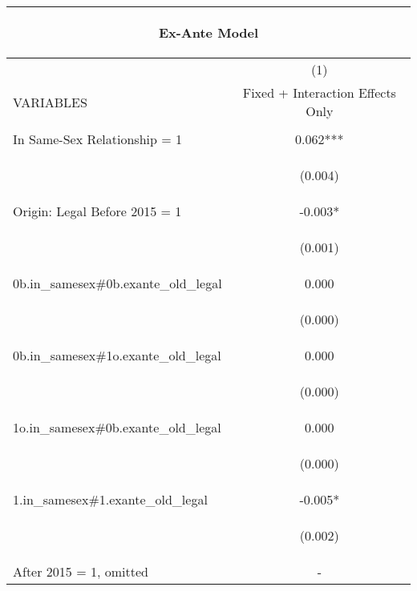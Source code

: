 \documentclass[]{article}
\begin{document}
\begin{center}
\begin{tabular}{lc}
\multicolumn{2}{c}{\begin{large}Ex-Ante Model\end{large}} \\ \hline
 & (1) \\
VARIABLES & Fixed + Interaction Effects Only \\ \hline
\vspace{4pt} & \begin{footnotesize}\end{footnotesize} \\
In Same-Sex Relationship = 1 & 0.062*** \\
\vspace{4pt} & \begin{footnotesize}(0.004)\end{footnotesize} \\
Origin: Legal Before 2015 = 1 & -0.003* \\
\vspace{4pt} & \begin{footnotesize}(0.001)\end{footnotesize} \\
0b.in\_samesex\#0b.exante\_old\_legal & 0.000 \\
\vspace{4pt} & \begin{footnotesize}(0.000)\end{footnotesize} \\
0b.in\_samesex\#1o.exante\_old\_legal & 0.000 \\
\vspace{4pt} & \begin{footnotesize}(0.000)\end{footnotesize} \\
1o.in\_samesex\#0b.exante\_old\_legal & 0.000 \\
\vspace{4pt} & \begin{footnotesize}(0.000)\end{footnotesize} \\
1.in\_samesex\#1.exante\_old\_legal & -0.005* \\
\vspace{4pt} & \begin{footnotesize}(0.002)\end{footnotesize} \\
After 2015 = 1, omitted & - \\

\end{tabular}
\end{center}
\end{document}
